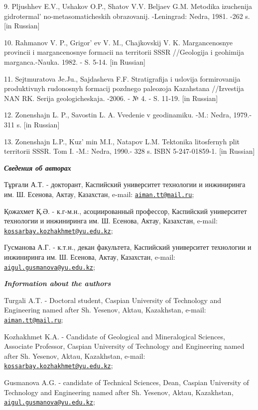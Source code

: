 9. Pljushhev E.V., Ushakov O.P., Shatov V.V. Beljaev G.M. Metodika
izuchenija gidrotermal' no-metasomaticheskih obrazovanij.
-Leningrad: Nedra, 1981. -262 s. {[}in Russian{]}

10. Rahmanov V. P., Grigor' ev V. M., Chajkovskij V. K.
Margancenosnye provincii i margancenosnye formacii na territorii SSSR
//Geologija i geohimija marganca.-Nauka. 1982. - S. 5-14. {[}in
Russian{]}

11. Sejtmuratova Je.Ju., Sajdasheva F.F. Stratigrafija i uslovija
formirovanija produktivnyh rudonosnyh formacij pozdnego paleozoja
Kazahstana //Izvestija NAN RK. Serija geologicheskaja. -2006. - № 4. -
S. 11-19. {[}in Russian{]}

12. Zonenshajn L. P., Savostin L. A. Vvedenie v geodinamiku. -M.: Nedra,
1979.- 311 s. {[}in Russian{]}

13. Zonenshajn L.P., Kuz' min M.I., Natapov L.M.
Tektonika litosfernyh plit territorii SSSR. Tom I. -M.: Nedra, 1990.-
328 s. ISBN 5-247-01859-1. {[}in Russian{]}

\emph{{\bfseries Сведения об авторах}}

Тұрғали А.Т. - докторант, Каспийский университет технологии и
инжиниринга им. Ш. Есенова, Актау, Казахстан, e-mail:
\href{mailto:aiman.tt@mail.ru}{\nolinkurl{aiman.tt@mail.ru}};

Қожахмет Қ.Ә. - к.г-м.н., асоциированный профессор, Каспийский
университет технологии и инжиниринга им. Ш. Есенова, Актау, Казахстан,
e-mail:
\href{mailto:kossarbay.kozhakhmet@yu.edu.kz}{\nolinkurl{kossarbay.kozhakhmet@yu.edu.kz}};

Гусманова А.Г. - к.т.н., декан факультета, Каспийский университет
технологии и инжиниринга им. Ш. Есенова, Актау, Казахстан, e-mail:
\href{mailto:aigul.gusmanova@yu.edu.kz}{\nolinkurl{aigul.gusmanova@yu.edu.kz}};

\emph{{\bfseries Information about the authors}}

Turgali A.T. - Doctoral student, Caspian University of Technology and
Engineering named after Sh. Yesenov, Aktau, Kazakhstan, e-mail:
\href{mailto:aiman.tt@mail.ru}{\nolinkurl{aiman.tt@mail.ru}};

Kozhakhmet K.A. - Candidate of Geological and Mineralogical Sciences,
Associate Professor, Caspian University of Technology and Engineering
named after Sh. Yesenov, Aktau, Kazakhstan, e-mail:
\href{mailto:kossarbay.kozhakhmet@yu.edu.kz}{\nolinkurl{kossarbay.kozhakhmet@yu.edu.kz}};

Gusmanova A.G. - candidate of Technical Sciences, Dean, Caspian
University of Technology and Engineering named after Sh. Yesenov, Aktau,
Kazakhstan,
\href{mailto:aigul.gusmanova@yu.edu.kz}{\nolinkurl{aigul.gusmanova@yu.edu.kz}};